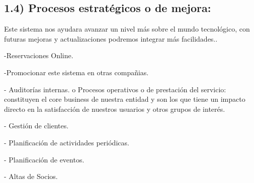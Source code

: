 \documentclass{article} %
\begin{document}
\noindent 

\noindent 

\noindent 

\noindent 

\noindent 

\noindent 

\noindent 

\noindent 

\noindent 

\noindent 

\noindent 

\noindent 

\noindent 


\subsection{ }


\subsection{}


\subsection{}


\subsection{ 1.4) Procesos estrat\'{e}gicos o de mejora: }

\noindent Este sistema nos ayudara avanzar un nivel m\'{a}s sobre el mundo tecnol\'{o}gico, con futuras mejoras  y actualizaciones podremos integrar m\'{a}s facilidades.. 

\noindent -Reservaciones Online. 

\noindent -Promocionar este sistema en otras compa\~{n}ias. 

\noindent - Auditor\'{i}as internas. o Procesos operativos o de prestaci\'{o}n del servicio: constituyen el core   business de nuestra entidad y son los que tiene un impacto directo en la satisfacci\'{o}n de nuestros usuarios y otros grupos de inter\'{e}s.

\noindent  - Gesti\'{o}n de clientes. 

\noindent - Planificaci\'{o}n de actividades peri\'{o}dicas. 

\noindent - Planificaci\'{o}n de eventos. 

\noindent - Altas de Socios. 
\end{document}
